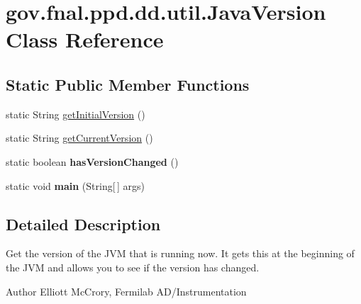 \hypertarget{classgov_1_1fnal_1_1ppd_1_1dd_1_1util_1_1JavaVersion}{\section{gov.\-fnal.\-ppd.\-dd.\-util.\-Java\-Version Class Reference}
\label{classgov_1_1fnal_1_1ppd_1_1dd_1_1util_1_1JavaVersion}
}
\subsection*{Static Public Member Functions}
\begin{DoxyCompactItemize}
\item 
static String \hyperlink{classgov_1_1fnal_1_1ppd_1_1dd_1_1util_1_1JavaVersion_aa40b3f3db4ff65495edd5a18adbeed55}{get\-Initial\-Version} ()
\item 
static String \hyperlink{classgov_1_1fnal_1_1ppd_1_1dd_1_1util_1_1JavaVersion_ab127bb617d7b81a0c0e6146b434ebff0}{get\-Current\-Version} ()
\item 
\hypertarget{classgov_1_1fnal_1_1ppd_1_1dd_1_1util_1_1JavaVersion_a664336c886ac7e00d30220ebb1f8b0f5}{static boolean {\bfseries has\-Version\-Changed} ()}\label{classgov_1_1fnal_1_1ppd_1_1dd_1_1util_1_1JavaVersion_a664336c886ac7e00d30220ebb1f8b0f5}

\item 
\hypertarget{classgov_1_1fnal_1_1ppd_1_1dd_1_1util_1_1JavaVersion_ad7df44b9056ee809a98c0cb215069832}{static void {\bfseries main} (String\mbox{[}$\,$\mbox{]} args)}\label{classgov_1_1fnal_1_1ppd_1_1dd_1_1util_1_1JavaVersion_ad7df44b9056ee809a98c0cb215069832}

\end{DoxyCompactItemize}


\subsection{Detailed Description}
Get the version of the J\-V\-M that is running now. It gets this at the beginning of the J\-V\-M and allows you to see if the version has changed.

\begin{DoxyAuthor}{Author}
Elliott Mc\-Crory, Fermilab A\-D/\-Instrumentation 
\end{DoxyAuthor}


